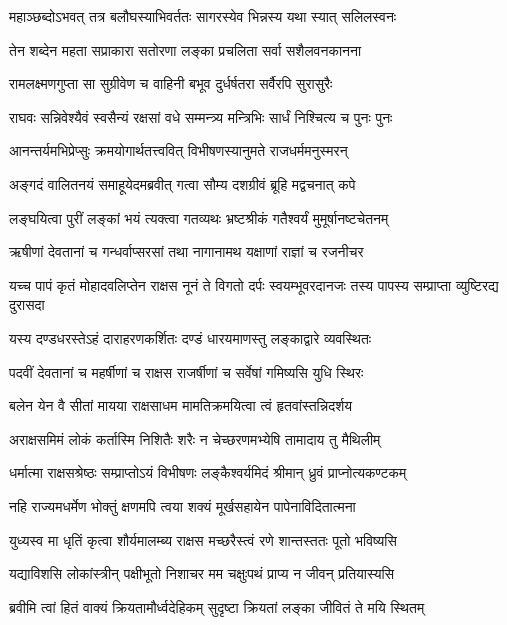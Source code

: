 \twolineshloka
{महाञ्छब्दोऽभवत् तत्र बलौघस्याभिवर्ततः}
{सागरस्येव भिन्नस्य यथा स्यात् सलिलस्वनः} %

\twolineshloka
{तेन शब्देन महता सप्राकारा सतोरणा}
{लङ्का प्रचलिता सर्वा सशैलवनकानना} %

\twolineshloka
{रामलक्ष्मणगुप्ता सा सुग्रीवेण च वाहिनी}
{बभूव दुर्धर्षतरा सर्वैरपि सुरासुरैः} %

\twolineshloka
{राघवः सन्निवेश्यैवं स्वसैन्यं रक्षसां वधे}
{सम्मन्त्र्य मन्त्रिभिः सार्धं निश्चित्य च पुनः पुनः} %

\twolineshloka
{आनन्तर्यमभिप्रेप्सुः क्रमयोगार्थतत्त्ववित्}
{विभीषणस्यानुमते राजधर्ममनुस्मरन्} %

\twolineshloka
{अङ्गदं वालितनयं समाहूयेदमब्रवीत्}
{गत्वा सौम्य दशग्रीवं ब्रूहि मद्वचनात् कपे} %

\twolineshloka
{लङ्घयित्वा पुरीं लङ्कां भयं त्यक्त्वा गतव्यथः}
{भ्रष्टश्रीकं गतैश्वर्यं मुमूर्षानष्टचेतनम्} %

\twolineshloka
{ऋषीणां देवतानां च गन्धर्वाप्सरसां तथा}
{नागानामथ यक्षाणां राज्ञां च रजनीचर} %

\threelineshloka
{यच्च पापं कृतं मोहादवलिप्तेन राक्षस}
{नूनं ते विगतो दर्पः स्वयम्भूवरदानजः}
{तस्य पापस्य सम्प्राप्ता व्युष्टिरद्य दुरासदा} %

\twolineshloka
{यस्य दण्डधरस्तेऽहं दाराहरणकर्शितः}
{दण्डं धारयमाणस्तु लङ्काद्वारे व्यवस्थितः} %

\twolineshloka
{पदवीं देवतानां च महर्षीणां च राक्षस}
{राजर्षीणां च सर्वेषां गमिष्यसि युधि स्थिरः} %

\twolineshloka
{बलेन येन वै सीतां मायया राक्षसाधम}
{मामतिक्रमयित्वा त्वं हृतवांस्तन्निदर्शय} %

\twolineshloka
{अराक्षसमिमं लोकं कर्तास्मि निशितैः शरैः}
{न चेच्छरणमभ्येषि तामादाय तु मैथिलीम्} %

\twolineshloka
{धर्मात्मा राक्षसश्रेष्ठः सम्प्राप्तोऽयं विभीषणः}
{लङ्कैश्वर्यमिदं श्रीमान् ध्रुवं प्राप्नोत्यकण्टकम्} %

\twolineshloka
{नहि राज्यमधर्मेण भोक्तुं क्षणमपि त्वया}
{शक्यं मूर्खसहायेन पापेनाविदितात्मना} %

\twolineshloka
{युध्यस्व मा धृतिं कृत्वा शौर्यमालम्ब्य राक्षस}
{मच्छरैस्त्वं रणे शान्तस्ततः पूतो भविष्यसि} %

\twolineshloka
{यद्याविशसि लोकांस्त्रीन् पक्षीभूतो निशाचर}
{मम चक्षुःपथं प्राप्य न जीवन् प्रतियास्यसि} %

\twolineshloka
{ब्रवीमि त्वां हितं वाक्यं क्रियतामौर्ध्वदेहिकम्}
{सुदृष्टा क्रियतां लङ्का जीवितं ते मयि स्थितम्} %

